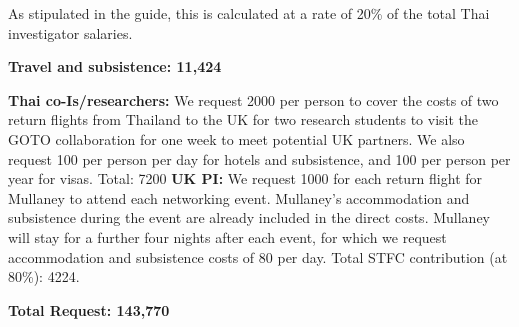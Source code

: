 \documentclass[11pt]{article}
\begin{document}
  \noindent
  As stipulated in the guide, this is calculated at a rate of 20\% of the total Thai investigator salaries.
  
  \vspace{3mm}
  \noindent
  {\bf Travel and subsistence: 11,424}

  \noindent
  {\bf Thai co-Is/researchers:} We request 2000 per person to cover the costs of two return flights from Thailand to the UK for two research students to visit the GOTO collaboration for one week to meet potential UK partners. We also request 100 per person per day for hotels and subsistence, and 100 per person per year for visas. Total: 7200 {\bf UK PI:} We request 1000 for each return flight for Mullaney to attend each networking event. Mullaney's accommodation and subsistence during the event are already included in the direct costs. Mullaney will stay for a further four nights after each event, for which we request accommodation and subsistence costs of 80 per day. Total STFC contribution (at 80\%): 4224.
  
  \vspace{3mm}
  \noindent
  {\bf Total Request: 143,770}

  
\end{document}
